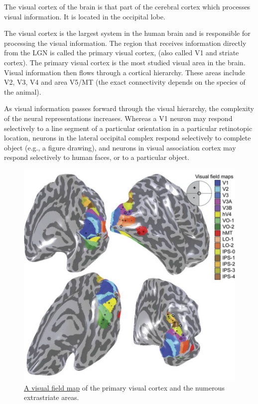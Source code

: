 The visual cortex of the brain is that part of the cerebral cortex which processes visual information. It is located in the occipital lobe.

The visual cortex is the largest system in the human brain and is responsible for processing the visual information. The region that receives information directly from the LGN is called the primary visual cortex, (also called V1 and striate cortex). The primary visual cortex is the most studied visual area in the brain. Visual information then flows through a cortical hierarchy. These areas include V2, V3, V4 and area V5/MT (the exact connectivity depends on the species of the animal).

As visual information passes forward through the visual hierarchy, the complexity of the neural representations increases. Whereas a V1 neuron may respond selectively to a line segment of a particular orientation in a particular retinotopic location, neurons in the lateral occipital complex respond selectively to complete object (e.g., a figure drawing), and neurons in visual association cortex may respond selectively to human faces, or to a particular object.



\begin{figure}

{\centering \includegraphics[width=0.7\linewidth]{./figures/visual/Visual_field_maps} 

}

\caption{\href{https://commons.wikimedia.org/wiki/File:Visual_field_maps.jpg}{A visual field map} of the primary visual cortex and the numerous extrastriate areas.}\label{fig:visualcortex}
\end{figure}

